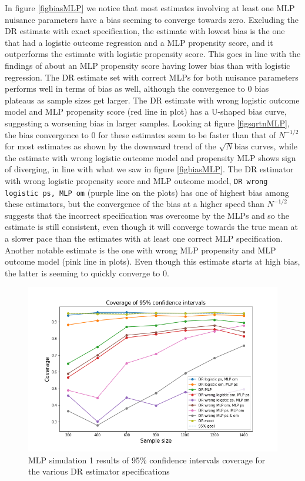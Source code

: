 \documentclass[12pt,twoside]{article}
\begin{document}
In figure \ref{figbiasMLP} we notice that most estimates involving at least one MLP nuisance parameters have a bias seeming to converge towards zero. Excluding the DR estimate with exact specification, the estimate with lowest bias is the one that had a logistic outcome regression and a MLP propensity score, and it outperforms the estimate with logistic propensity score. This goes in line with the findings of \citet{setoguchi-nn} about an MLP propensity score having lower bias than with logistic regression. The DR estimate set with correct MLPs for both nuisance parameters performs well in terms of bias as well, although the convergence to 0 bias plateaus as sample sizes get larger. The DR estimate with wrong logistic outcome model and MLP propensity score (red line in plot) has a U-shaped bias curve, suggesting a worsening bias in larger samples. Looking at figure \ref{figsqrtnMLP}, the bias convergence to 0 for these estimates seem to be faster than that of $N^{-1/2}$ for most estimates as shown by the downward trend of the $\sqrt{N}$bias curves, while the estimate with wrong logistic outcome model and propensity MLP shows sign of diverging, in line with what we saw in figure \ref{figbiasMLP}. The DR estimator with wrong logistic propensity score and MLP outcome model, \texttt{DR wrong logistic ps, MLP om} (purple line on the plots) has one of highest bias among these estimators, but the convergence of the bias at a higher speed than $N^{-1/2}$ suggests that the incorrect specification was overcome by the MLPs and so the estimate is still consistent, even though it will converge towards the true mean at a slower pace than the estimates with at least one correct MLP specification. Another notable estimate is the one with wrong MLP propensity and MLP outcome model (pink line in plots). Even though this estimate starts at high bias, the latter is seeming to quickly converge to 0.

\begin{figure}[h!]
    \centering
    \includegraphics[width = 0.9\columnwidth]{figures/CIMLP.png}
    \caption{MLP simulation 1 results of 95\% confidence intervals coverage for the various DR estimator specifications}
    \label{figCIMLP}
\end{figure}
\end{document}
